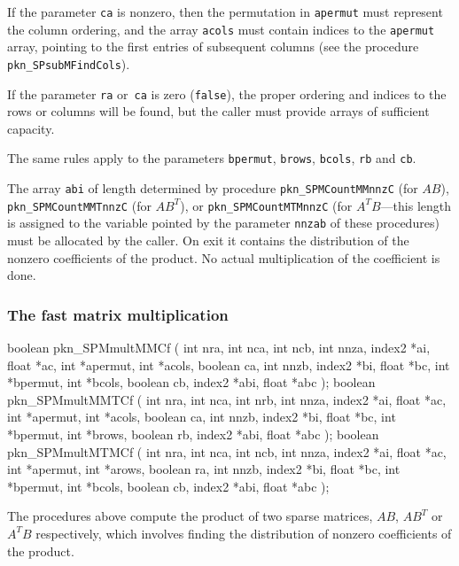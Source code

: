 If the parameter \texttt{ca} is nonzero, then the permutation in
\texttt{apermut} must represent the column ordering, and the array
\texttt{acols} must contain indices to the \texttt{apermut} array, pointing
to the first entries of subsequent columns (see the procedure
\texttt{pkn\_SPsubMFindCols}).

If the parameter \texttt{ra} or~\texttt{ca} is zero (\texttt{false}), the
proper ordering and indices to the rows or columns will be found, but the
caller must provide arrays of sufficient capacity.

The same rules apply to the parameters \texttt{bpermut}, \texttt{brows},
\texttt{bcols}, \texttt{rb} and \texttt{cb}.

The array \texttt{abi} of length determined by procedure
\texttt{pkn\_SPMCountMMnnzC} (for $AB$), \texttt{pkn\_SPMCountMMTnnzC} (for
$AB^T$), or \texttt{pkn\_SPMCountMTMnnzC} (for $A^TB$---this length is
assigned to the variable pointed by the parameter \texttt{nnzab} of these
procedures) must be allocated by the caller. On exit it contains the
distribution of the nonzero coefficients of the product. No actual
multiplication of the coefficient is done.


\subsubsection{The fast matrix multiplication}

\begin{listingC}
boolean pkn_SPMmultMMCf ( int nra, int nca, int ncb,
                          int nnza, index2 *ai, float *ac,
                          int *apermut, int *acols, boolean ca,
                          int nnzb, index2 *bi, float *bc,
                          int *bpermut, int *bcols, boolean cb,
                          index2 *abi, float *abc );
boolean pkn_SPMmultMMTCf ( int nra, int nca, int nrb,
                           int nnza, index2 *ai, float *ac,
                           int *apermut, int *acols, boolean ca,
                           int nnzb, index2 *bi, float *bc,
                           int *bpermut, int *brows, boolean rb,
                           index2 *abi, float *abc );
boolean pkn_SPMmultMTMCf ( int nra, int nca, int ncb,
                           int nnza, index2 *ai, float *ac,
                           int *apermut, int *arows, boolean ra,
                           int nnzb, index2 *bi, float *bc,
                           int *bpermut, int *bcols, boolean cb,
                           index2 *abi, float *abc );
\end{listingC}
The procedures above compute the product of two sparse matrices,
$AB$, $AB^T$ or~$A^TB$ respectively, which involves finding the distribution
of nonzero coefficients of the product.

